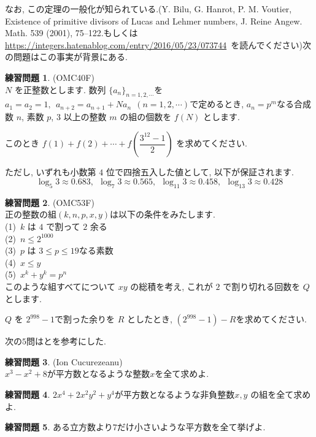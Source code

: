 \documentclass{ltjsarticle}
\theoremstyle{definition}
\newtheorem{prob}{練習問題}
\begin{document}
なお, この定理の一般化が知られている.(Y. Bilu, G. Hanrot, P. M. Voutier, Existence of primitive divisors of Lucas and Lehmer numbers, J. Reine Angew. Math. 539 (2001), 75--122.もしくは\url{https://integers.hatenablog.com/entry/2016/05/23/073744}\ を読んでください)次の問題はこの事実が背景にある.

\begin{prob}(OMC40F)\\
$N$ を正整数とします. 数列 $\lbrace a_n\rbrace_{n=1,2,\cdots}$を
$a_1=a_2=1,\ \ a_{n+2}=a_{n+1}+Na_{n}\ \ (n=1,2,\cdots)$で定めるとき, $a_n=p^m$なる合成数 $n$, 素数 $p$, $3$ 以上の整数 $m$ の組の個数を $f(N)$ とします.

このとき
$f(1)+f(2)+\cdots+f\left(\dfrac{3^{12}-1}{2}\right)$
を求めてください. 

ただし, いずれも小数第 $4$ 位で四捨五入した値として, 以下が保証されます.
$$\log_{5}{3}\approx 0.683,\ \ \log_{7}{3}\approx 0.565,\ \ \log_{11}{3}\approx 0.458,\ \ \log_{13}{3}\approx 0.428$$
\end{prob}

\begin{prob}(OMC53F)\\
正の整数の組$(k,n,p,x,y)$は以下の条件をみたします.\\
(1)\ $k$ は $4$ で割って $2$ 余る\\
(2)\ $n\leq 2^{1000}$\\
(3)\ $p$ は $3\leq p\leq 19$なる素数\\
(4)\ $x\leq y$\\
(5)\ $x^k+y^k=p^n$\\
このような組すべてについて $xy$ の総積を考え, これが $2$ で割り切れる回数を $Q$ とします.

$Q$ を $2^{998}-1$で割った余りを $R$ としたとき, $(2^{998}-1)-R$を求めてください.
\end{prob}

次の$5$問は\cite{フィボナッチ平方数}と\cite{平方数の和の素因数}を参考にした.

\begin{prob}(Ion Cucurezeanu)\\
$x^3−x^2+8$が平方数となるような整数$x$を全て求めよ.
\end{prob}

\begin{prob}
$2x^4+2x^2y^2+y^4$が平方数となるような非負整数$x,y$
の組を全て求めよ.
\end{prob}

\begin{prob}
ある立方数より$7$だけ小さいような平方数を全て挙げよ.
\end{prob}
\end{document}

